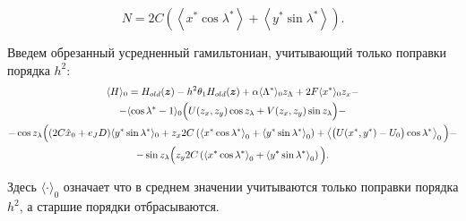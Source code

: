 $$N = 2C \left( \left\langle x^* \cos \lambda^* \right\rangle + \left\langle y^* \sin \lambda^* \right\rangle \right).$$

Введем обрезанный усредненный гамильтониан, учитывающий только поправки порядка $h^2$:
\begin{multline}
\langle H \rangle_0 = H_{old}(\boldsymbol{z}) - h^2 \theta_1 H_{old}(\boldsymbol{z}) + \alpha \langle \Lambda^* \rangle_0 z_\Lambda + 2F \langle x^* \rangle_0 z_x - \\ - \langle \cos \lambda^* -1 \rangle_0 \Big( U(z_x,z_y) \cos z_\lambda + V(z_x,z_y) \sin z_\lambda \Big) - \\
- \cos z_\lambda \Big( (2C \hat x_0 + e_J D) \langle y^* \sin \lambda^* \rangle_0 + z_x 2C \left( \left\langle x^* \cos \lambda^* \right\rangle_0 + \left\langle y^* \sin \lambda^* \right\rangle_0 \right) + \left\langle \big( U(x^*,y^*) - U_0 \big) \cos \lambda^* \right\rangle_0 \Big) - \\
- \sin z_\lambda \Big( z_y 2C \left( \left\langle x^* \cos \lambda^* \right\rangle_0 + \left\langle y^* \sin \lambda^* \right\rangle_0 \right) \Big).
\label{avg_ham}
\end{multline}

Здесь $\langle \cdot \rangle_0$ означает что в среднем значении учитываются только поправки порядка $h^2$, а старшие порядки отбрасываются.


